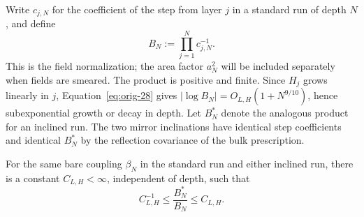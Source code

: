Write $c_{j,N}$ for the coefficient of the step from layer $j$
in a standard run of depth $N$, and define
\begin{equation}
 B_N:=\prod_{j=1}^Nc_{j,N}^{-1}.
 \label{eq:field-normalization}
\end{equation}
This is the field normalization; the area factor $a_N^2$ will
be included separately when fields are smeared.  The product
is positive and finite.  Since $H_j$ grows linearly in $j$,
Equation~\eqref{eq:orig-28} gives
$|\log B_N|=O_{L,H}(1+N^{9/10})$, hence subexponential growth
or decay in depth.  Let $B_N^*$ denote the analogous product
for an inclined run.  The two mirror inclinations have identical
step coefficients and identical $B_N^*$ by the reflection
covariance of the bulk prescription.

\begin{proposition}
\label{prop:source-products}
For the same bare coupling $\beta_N$ in the standard run and
either inclined run, there is a constant $C_{L,H}<\infty$,
independent of depth, such that
\begin{equation}
 C_{L,H}^{-1}\le\frac{B_N^*}{B_N}\le C_{L,H}.
 \label{eq:orig-33}
\end{equation}
\end{proposition}

